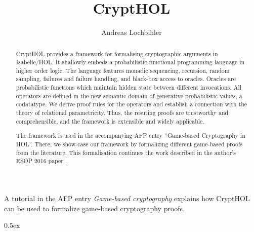 \documentclass[11pt,a4paper]{article}
\begin{document}
\title{CryptHOL}
\author{Andreas Lochbihler}
\maketitle

\begin{abstract}
  CryptHOL provides a framework for formalising cryptographic arguments in Isabelle/HOL.
  It shallowly embeds a probabilistic functional programming language in higher order logic.
  The language features monadic sequencing, recursion, random sampling, failures and failure handling,
  and black-box access to oracles. Oracles are probabilistic functions which maintain hidden state
  between different invocations.  All operators are defined in the new semantic domain of generative
  probabilistic values, a codatatype.  We derive proof rules for the operators and establish a connection
  with the theory of relational parametricity.  Thus, the resuting proofs are trustworthy and comprehensible,
  and the framework is extensible and widely applicable.

  The framework is used in the accompanying AFP entry ``Game-based Cryptography in HOL''.
  There, we show-case our framework by formalizing different game-based proofs from the literature.
  This formalisation continues the work described in the author's ESOP 2016 paper \cite{Lochbihler2016ESOP}.
\end{abstract}

A tutorial in the AFP entry \emph{Game-based cryptography} explains how CryptHOL can be used to formalize game-based cryptography proofs.


\tableofcontents

\clearpage

\parindent 0pt\parskip 0.5ex





\end{document}
